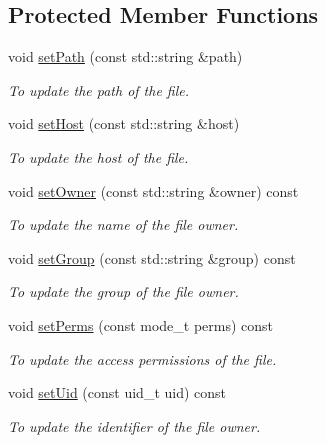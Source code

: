 \subsection*{Protected Member Functions}
\begin{DoxyCompactItemize}
\item 
void \hyperlink{classFile_ace8ab8b98c3435c79106e6eb4346ae83}{setPath} (const std::string \&path)
\begin{DoxyCompactList}\small\item\em To update the path of the file. \item\end{DoxyCompactList}\item 
void \hyperlink{classFile_a1dab18179bdfb51685bbdfdd67bda920}{setHost} (const std::string \&host)
\begin{DoxyCompactList}\small\item\em To update the host of the file. \item\end{DoxyCompactList}\item 
void \hyperlink{classFile_a7a2722df520658d92911cce52e3b7a77}{setOwner} (const std::string \&owner) const 
\begin{DoxyCompactList}\small\item\em To update the name of the file owner. \item\end{DoxyCompactList}\item 
void \hyperlink{classFile_aabc387f38012568f3939c453c6088f34}{setGroup} (const std::string \&group) const 
\begin{DoxyCompactList}\small\item\em To update the group of the file owner. \item\end{DoxyCompactList}\item 
void \hyperlink{classFile_a0897fa173d69a732771fab5d1291bfa1}{setPerms} (const mode\_\-t perms) const 
\begin{DoxyCompactList}\small\item\em To update the access permissions of the file. \item\end{DoxyCompactList}\item 
void \hyperlink{classFile_a2510d79e08b9bce8bcbb4dbab3948ff6}{setUid} (const uid\_\-t uid) const 
\begin{DoxyCompactList}\small\item\em To update the identifier of the file owner. \item\end{DoxyCompactList}\item 

\end{DoxyCompactItemize}
